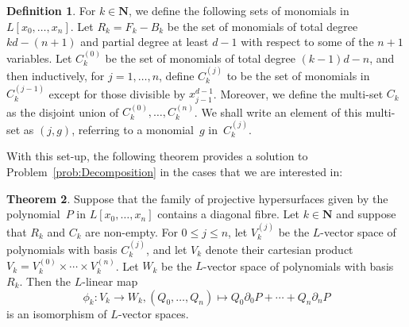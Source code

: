 \documentclass[a4paper,11pt]{article}
\numberwithin{equation}{section}
\newcommand{\NN}{\mathbf{N}} %
\renewcommand{\to}{\rightarrow}        %
\theoremstyle{definition}
\newtheorem{thm}{Theorem}[section]
\newtheorem{defn}[thm]{Definition}
\begin{document}
\begin{defn} \label{defn:IndexSets}
For $k \in \NN$, we define the following sets of monomials in 
$L[x_0, \dotsc, x_n]$.  Let $R_k = F_k - B_k$ be the set of monomials of 
total degree $kd-(n+1)$ and partial degree at least $d-1$ with respect to some 
of the $n+1$ variables.  Let $C_k^{(0)}$ be the set of monomials of total 
degree $(k-1)d - n$, and then inductively, for $j = 1, \dotsc, n$, define 
$C_k^{(j)}$ to be the set of monomials in $C_k^{(j-1)}$ except for those 
divisible by $x_{j-1}^{d-1}$.  Moreover, we define the multi-set $C_k$ as 
the disjoint union of $C_k^{(0)}, \dotsc, C_k^{(n)}$.  We shall write an 
element of this multi-set as $(j, g)$, referring to a monomial~$g$ 
in~$C_k^{(j)}$.
\end{defn}

With this set-up, the following theorem provides a solution to 
Problem~\ref{prob:Decomposition} in the cases that we are interested in:

\begin{thm} \label{thm:Isomorphism}
Suppose that the family of projective hypersurfaces given by the 
polynomial~$P$ in $L[x_0, \dotsc, x_n]$ contains a diagonal fibre.  
Let $k \in \NN$ and suppose that $R_k$ and $C_k$ are non-empty.  For 
$0 \leq j \leq n$, let $V_k^{(j)}$ be the $L$-vector space of 
polynomials with basis $C_k^{(j)}$, and let $V_k$ denote their cartesian 
product $V_k = V_k^{(0)} \times \dotsb \times V_k^{(n)}$.  Let $W_k$ be 
the $L$-vector space of polynomials with basis~$R_k$.  Then the $L$-linear 
map 
\begin{equation}
\phi_k \colon V_k \to W_k, 
(Q_0, \dotsc, Q_n) \mapsto Q_0 \partial_0 P + \dotsb + Q_n \partial_n P
\end{equation}
is an isomorphism of $L$-vector spaces.
\end{thm}
\end{document}

